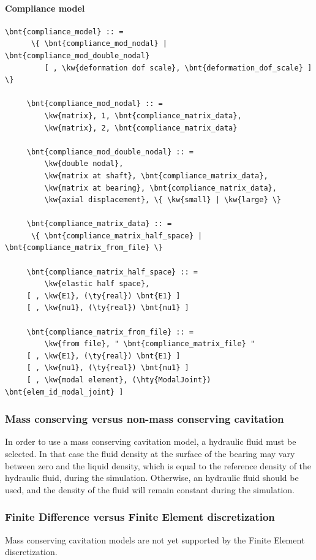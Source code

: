 \paragraph{Compliance model}
\begin{Verbatim}[commandchars=\\\{\}]
     \bnt{compliance_model} :: =
      \{ \bnt{compliance_mod_nodal} | \bnt{compliance_mod_double_nodal}
         [ , \kw{deformation dof scale}, \bnt{deformation_dof_scale} ] \}

     \bnt{compliance_mod_nodal} :: =
         \kw{matrix}, 1, \bnt{compliance_matrix_data},
         \kw{matrix}, 2, \bnt{compliance_matrix_data}

     \bnt{compliance_mod_double_nodal} :: =
         \kw{double nodal},
         \kw{matrix at shaft}, \bnt{compliance_matrix_data},
         \kw{matrix at bearing}, \bnt{compliance_matrix_data},
         \kw{axial displacement}, \{ \kw{small} | \kw{large} \}

     \bnt{compliance_matrix_data} :: =
      \{ \bnt{compliance_matrix_half_space} | \bnt{compliance_matrix_from_file} \}

     \bnt{compliance_matrix_half_space} :: =
         \kw{elastic half space},
     [ , \kw{E1}, (\ty{real}) \bnt{E1} ]
     [ , \kw{nu1}, (\ty{real}) \bnt{nu1} ]

     \bnt{compliance_matrix_from_file} :: =
         \kw{from file}, " \bnt{compliance_matrix_file} "
     [ , \kw{E1}, (\ty{real}) \bnt{E1} ]
     [ , \kw{nu1}, (\ty{real}) \bnt{nu1} ]
     [ , \kw{modal element}, (\hty{ModalJoint}) \bnt{elem_id_modal_joint} ]
\end{Verbatim}

\subsubsection{Mass conserving versus non-mass conserving cavitation}
In order to use a mass conserving cavitation model, a  hydraulic fluid must be selected. In that case the fluid density at the surface of the bearing may vary between zero and the liquid density, which is equal to the reference density of the hydraulic fluid, during the simulation. Otherwise, an  hydraulic fluid should be used, and the density of the fluid will remain constant during the simulation.
\subsubsection{Finite Difference versus Finite Element discretization}
Mass conserving cavitation models are not yet supported by the Finite Element discretization.
